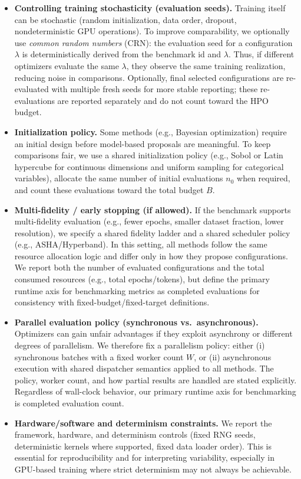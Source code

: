 \begin{itemize}
    \item \textbf{Controlling training stochasticity (evaluation seeds).}
    Training itself can be stochastic (random initialization, data order, dropout, nondeterministic GPU operations).
    To improve comparability, we optionally use \emph{common random numbers} (CRN):
    the evaluation seed for a configuration \(\lambda\) is deterministically derived from the benchmark id and \(\lambda\).
    Thus, if different optimizers evaluate the same \(\lambda\), they observe the same training realization, reducing noise in comparisons.
    Optionally, final selected configurations are re-evaluated with multiple fresh seeds for more stable reporting;
    these re-evaluations are reported separately and do not count toward the HPO budget.

    \item \textbf{Initialization policy.}
    Some methods (e.g., Bayesian optimization) require an initial design before model-based proposals are meaningful.
    To keep comparisons fair, we use a shared initialization policy (e.g., Sobol or Latin hypercube for continuous dimensions
    and uniform sampling for categorical variables), allocate the same number of initial evaluations \(n_0\) when required,
    and count these evaluations toward the total budget \(B\).

    \item \textbf{Multi-fidelity / early stopping (if allowed).}
    If the benchmark supports multi-fidelity evaluation (e.g., fewer epochs, smaller dataset fraction, lower resolution),
    we specify a shared fidelity ladder and a shared scheduler policy (e.g., ASHA/Hyperband).
    In this setting, all methods follow the same resource allocation logic and differ only in how they propose configurations.
    We report both the number of evaluated configurations and the total consumed resources (e.g., total epochs/tokens),
    but define the primary runtime axis for benchmarking metrics as completed evaluations for consistency with fixed-budget/fixed-target definitions.

    \item \textbf{Parallel evaluation policy (synchronous vs.\ asynchronous).}
    Optimizers can gain unfair advantages if they exploit asynchrony or different degrees of parallelism.
    We therefore fix a parallelism policy:
    either (i) synchronous batches with a fixed worker count \(W\), or (ii) asynchronous execution with shared dispatcher semantics
    applied to all methods. The policy, worker count, and how partial results are handled are stated explicitly.
    Regardless of wall-clock behavior, our primary runtime axis for benchmarking is completed evaluation count.

    \item \textbf{Hardware/software and determinism constraints.}
    We report the framework, hardware, and determinism controls (fixed RNG seeds, deterministic kernels where supported,
    fixed data loader order). This is essential for reproducibility and for interpreting variability, especially in GPU-based training
    where strict determinism may not always be achievable.
\end{itemize}
